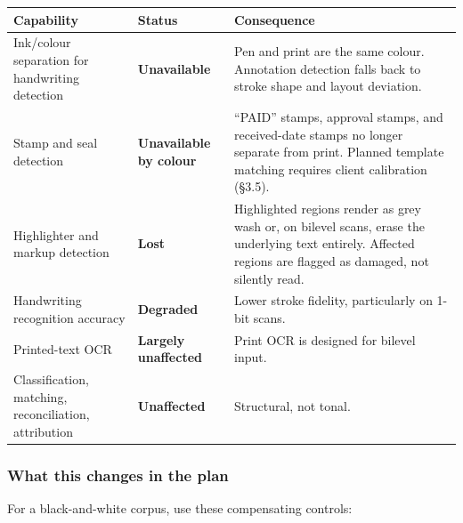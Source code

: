 \documentclass[
]{article}
\newcounter{none} %
\begin{document}
{\def\LTcaptype{none} %
\begin{longtable}[]{@{}
  >{\raggedright\arraybackslash}p{}
  >{\raggedright\arraybackslash}p{}
  >{\raggedright\arraybackslash}p{}@{}}
\toprule\noalign{}
\begin{minipage}[b]{\linewidth}\raggedright
Capability
\end{minipage} & \begin{minipage}[b]{\linewidth}\raggedright
Status
\end{minipage} & \begin{minipage}[b]{\linewidth}\raggedright
Consequence
\end{minipage} \\
\midrule\noalign{}
\endhead
\bottomrule\noalign{}
\endlastfoot
Ink/colour separation for handwriting detection & \textbf{Unavailable} &
Pen and print are the same colour. Annotation detection falls back to
stroke shape and layout deviation. \\
Stamp and seal detection & \textbf{Unavailable by colour} & ``PAID''
stamps, approval stamps, and received-date stamps no longer separate
from print. Planned template matching requires client calibration
(§3.5). \\
Highlighter and markup detection & \textbf{Lost} & Highlighted regions
render as grey wash or, on bilevel scans, erase the underlying text
entirely. Affected regions are flagged as damaged, not silently read. \\
Handwriting recognition accuracy & \textbf{Degraded} & Lower stroke
fidelity, particularly on 1-bit scans. \\
Printed-text OCR & \textbf{Largely unaffected} & Print OCR is designed
for bilevel input. \\
Classification, matching, reconciliation, attribution &
\textbf{Unaffected} & Structural, not tonal. \\
\end{longtable}
}

\subsubsection{What this changes in the
plan}\label{what-this-changes-in-the-plan}

For a black-and-white corpus, use these compensating controls:
\end{document}
